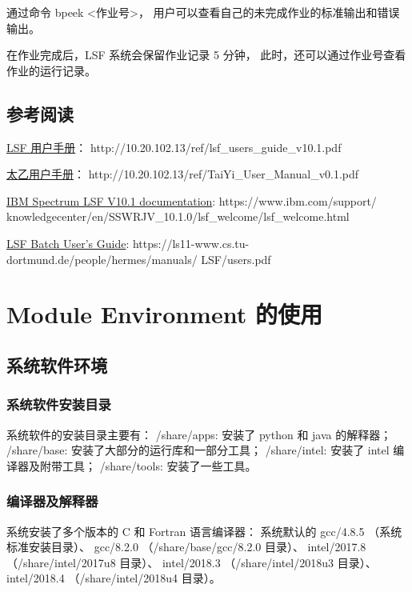 \documentclass[UTF8]{ctexart}
\newcommand{\mynnote}[1]{\colorbox{gray!15}{\color{red}#1}}
\begin{document}
通过命令 \mynnote{bpeek <作业号>}，
用户可以查看自己的未完成作业的标准输出和错误输出。

在作业完成后，LSF 系统会保留作业记录 5 分钟，
此时，还可以通过作业号查看作业的运行记录。

\subsection{参考阅读}
\href{http://10.20.102.13/ref/lsf_users_guide_v10.1.pdf}{LSF 用户手册}：
http://10.20.102.13/ref/lsf\_users\_guide\_v10.1.pdf

\href{http://10.20.102.13/ref/TaiYi_User_Manual_v0.1.pdf}{太乙用户手册}：
http://10.20.102.13/ref/TaiYi\_User\_Manual\_v0.1.pdf

\href{https://www.ibm.com/support/knowledgecenter/en/SSWRJV_10.1.0/lsf_welcome/lsf_welcome.html}{IBM Spectrum LSF V10.1 documentation}:
https://www.ibm.com/support/\newline
knowledgecenter/en/SSWRJV\_10.1.0/lsf\_welcome/lsf\_welcome.html

\href{https://ls11-www.cs.tu-dortmund.de/people/hermes/manuals/LSF/users.pdf}{LSF Batch User's Guide}:
https://ls11-www.cs.tu-dortmund.de/people/hermes/manuals/\newline
LSF/users.pdf

\section{Module Environment 的使用}
\subsection{系统软件环境}
\subsubsection{系统软件安装目录}
系统软件的安装目录主要有：\newline
/share/apps: 安装了 python 和 java 的解释器；\newline
/share/base: 安装了大部分的运行库和一部分工具；\newline
/share/intel: 安装了 intel 编译器及附带工具；\newline
/share/tools: 安装了一些工具。

\subsubsection{编译器及解释器}
系统安装了多个版本的 C 和 Fortran 语言编译器：\newline
系统默认的 gcc/4.8.5 （系统标准安装目录）、\newline
gcc/8.2.0 （/share/base/gcc/8.2.0 目录）、\newline
intel/2017.8 （/share/intel/2017u8 目录）、\newline
intel/2018.3 （/share/intel/2018u3 目录）、\newline
intel/2018.4 （/share/intel/2018u4 目录）。
\bigskip
\end{document}

